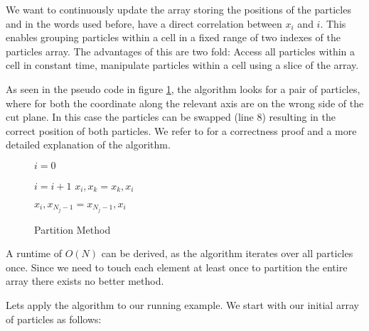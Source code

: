 \documentclass[]{article}
\begin{document}
We want to continuously update the array storing the positions of the particles and in the words used before, have a direct correlation between $x_i$ and $i$. This enables grouping particles within a cell in a fixed range of two indexes of the particles array. The advantages of this are two fold: Access all particles within a cell in constant time, manipulate particles within a cell using a slice of the array. 

As seen in the pseudo code in figure \ref{proc:part}, the algorithm looks for a pair of particles, where for both the coordinate along the relevant axis are  on the wrong side of the cut plane. In this case the particles can be swapped (line 8) resulting in the correct position of both particles. We refer to \cite{algorithms} for a correctness proof and a more detailed explanation of the algorithm. 

\algnewcommand{}


\begin{figure}[H]
	\begin{algorithmic}[1]
		\State $i = 0$
		
			\State $i = i + 1$
		\EndWhile
		\State $x_{i}, x_{k} = x_{k}, x_{i}$
		\EndIf
		\EndFor
		
		\State $ x_{i}, x_{N_j-1} = x_{N_j-1}, x_{i}$
		\EndProcedure
	\end{algorithmic}
\caption{Partition Method}
\label{proc:part}
\end{figure}

A runtime of $O(N)$ can be derived, as the algorithm iterates over all particles once. Since we need to touch each element at least once to partition the entire array there exists no better method.

Lets apply the algorithm to our running example. We start with our initial array of particles as follows:

\begin{figure}[H]
	\begin{center}
	\end{center}
\end{figure}
\end{document}

